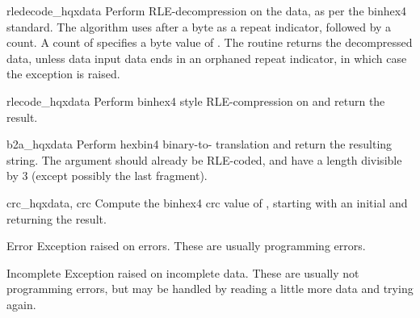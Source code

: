 \begin{funcdesc}{rledecode_hqx}{data}
Perform RLE-decompression on the data, as per the binhex4
standard. The algorithm uses  after a byte as a repeat
indicator, followed by a count. A count of  specifies a byte
value of . The routine returns the decompressed data,
unless data input data ends in an orphaned repeat indicator, in which
case the  exception is raised.
\end{funcdesc}

\begin{funcdesc}{rlecode_hqx}{data}
Perform binhex4 style RLE-compression on  and return the
result.
\end{funcdesc}

\begin{funcdesc}{b2a_hqx}{data}
Perform hexbin4 binary-to-\ASCII{} translation and return the
resulting string. The argument should already be RLE-coded, and have a
length divisible by 3 (except possibly the last fragment).
\end{funcdesc}

\begin{funcdesc}{crc_hqx}{data, crc}
Compute the binhex4 crc value of , starting with an initial
 and returning the result.
\end{funcdesc}
 
\begin{excdesc}{Error}
Exception raised on errors. These are usually programming errors.
\end{excdesc}

\begin{excdesc}{Incomplete}
Exception raised on incomplete data. These are usually not programming
errors, but may be handled by reading a little more data and trying
again.
\end{excdesc}

